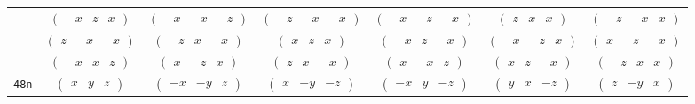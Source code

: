\documentclass[fleqn,9pt,landscape]{jsarticle}
\begin{document}
\begin{center}
\begin{longtable}{ccccccc}
& $ \begin{pmatrix} - x & z & x \end{pmatrix} $ & $ \begin{pmatrix} - x & - x & - z \end{pmatrix} $ & $ \begin{pmatrix} - z & - x & - x \end{pmatrix} $ & $ \begin{pmatrix} - x & - z & - x \end{pmatrix} $ & $ \begin{pmatrix} z & x & x \end{pmatrix} $ & $ \begin{pmatrix} - z & - x & x \end{pmatrix} $ \\
& $ \begin{pmatrix} z & - x & - x \end{pmatrix} $ & $ \begin{pmatrix} - z & x & - x \end{pmatrix} $ & $ \begin{pmatrix} x & z & x \end{pmatrix} $ & $ \begin{pmatrix} - x & z & - x \end{pmatrix} $ & $ \begin{pmatrix} - x & - z & x \end{pmatrix} $ & $ \begin{pmatrix} x & - z & - x \end{pmatrix} $ \\
& $ \begin{pmatrix} - x & x & z \end{pmatrix} $ & $ \begin{pmatrix} x & - z & x \end{pmatrix} $ & $ \begin{pmatrix} z & x & - x \end{pmatrix} $ & $ \begin{pmatrix} x & - x & z \end{pmatrix} $ & $ \begin{pmatrix} x & z & - x \end{pmatrix} $ & $ \begin{pmatrix} - z & x & x \end{pmatrix} $ \\ \hline
{\tt 48n} & $ \begin{pmatrix} x & y & z \end{pmatrix} $ & $ \begin{pmatrix} - x & - y & z \end{pmatrix} $ & $ \begin{pmatrix} x & - y & - z \end{pmatrix} $ & $ \begin{pmatrix} - x & y & - z \end{pmatrix} $ & $ \begin{pmatrix} y & x & - z \end{pmatrix} $ & $ \begin{pmatrix} z & - y & x \end{pmatrix} $ \\

\end{longtable}
\end{center}
\end{document}
